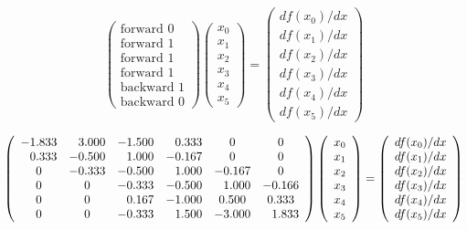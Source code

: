 \documentclass[12pt]{article}
\begin{document}
$$\left(\begin{array}{c}
\text{forward 0} \\
\text{forward 1} \\
\text{forward 1} \\
\text{forward 1} \\
\text{backward 1} \\
\text{backward 0}
\end{array} \right)
\left( \begin{array}{c}
x_0 \\
x_1 \\
x_2 \\
x_3 \\
x_4 \\
x_5 
\end{array} \right)
= \left(\begin{array}{c}
df(x_0)/dx \\
df(x_1)/dx \\
df(x_2)/dx \\
df(x_3)/dx \\
df(x_4)/dx \\
df(x_5)/dx 
\end{array} \right)$$


$$\left(\begin{array}{c c c c c c}
-1.833 & \phantom{-}3.000 & -1.500 & \phantom{-}0.333 & 0 & 0 \\
\phantom{-}0.333 & -0.500 & \phantom{-}1.000 & -0.167 & 0 & 0 \\
0 & -0.333 & -0.500 & \phantom{-}1.000 & -0.167 & 0 \\
0 & 0 & -0.333 & -0.500 & \phantom{-}1.000 & -0.166 \\
0 & 0 & \phantom{-}0.167 & -1.000 & 0.500 & 0.333 \\
0 & 0 & -0.333 & \phantom{-}1.500 & -3.000 & \phantom{-}1.833
\end{array} \right)
\left( \begin{array}{c}
x_0 \\
x_1 \\
x_2 \\
x_3 \\
x_4 \\
x_5 
\end{array} \right)
= \left(\begin{array}{c}
df(x_0)/dx \\
df(x_1)/dx \\
df(x_2)/dx \\
df(x_3)/dx \\
df(x_4)/dx \\
df(x_5)/dx 
\end{array} \right)$$
\end{document}
